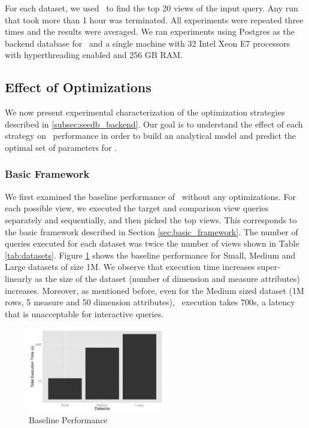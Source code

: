 For each dataset, we used \SeeDB\ to find the top 20 views of the input query.
Any run that took more than 1 hour was terminated. All experiments were repeated
three times and the results were averaged.
We ran experiments using Postgres as the backend database for \SeeDB\ and a single
machine with 32 Intel Xeon E7 processors with hyperthreading enabled and 256 GB
RAM.

\subsection{Effect of Optimizations}
\label{sec:experiments}
We now present experimental characterization of the optimization
strategies described in \ref{subsec:seedb_backend}. Our goal is to understand
the effect of each strategy on \SeeDB\ performance in order to build an
analytical model and predict the optimal set of parameters for \SeeDB.

\subsubsection{Basic Framework}
We first examined the baseline performance of \SeeDB\ without any optimizations.
For each possible view, we executed the target and comparison view queries
separately and sequentially, and then picked the top views. This corresponds to
the basic framework described in Section \ref{sec:basic_framework}. The number
of queries executed for each dataset was twice the number of views shown in
Table \ref{tab:datasets}. Figure \ref{fig:baseline_performance} shows the baseline
performance for Small, Medium and Large datasets of size 1M. We observe that
execution time increases super-linearly as the size of the dataset (number of dimension and
measure attributes) increases. Moreover, as mentioned before, even for the
Medium sized dataset (1M rows, 5 measure and 50 dimension attributes), \SeeDB\
execution takes 700s, a latency that is unacceptable for interactive queries.

\begin{figure}[h]
  \centering
    \includegraphics[width=6cm]{Images/baseline_performance.pdf}
    \caption{Baseline Performance} 
      \label{fig:baseline_performance}
\end{figure}


